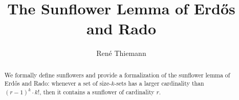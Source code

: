 \documentclass[11pt,a4paper]{article}
\begin{document}
\title{The Sunflower Lemma of Erd\H{o}s and Rado}
\author{René Thiemann}
\maketitle

\begin{abstract}
We formally define sunflowers and provide a formalization of
the sunflower lemma of Erd\H{o}s and Rado: whenever a set of size-$k$-sets has a larger cardinality 
than $(r - 1)^k \cdot k!$, then it contains a sunflower of cardinality $r$.
\end{abstract}





\end{document}
